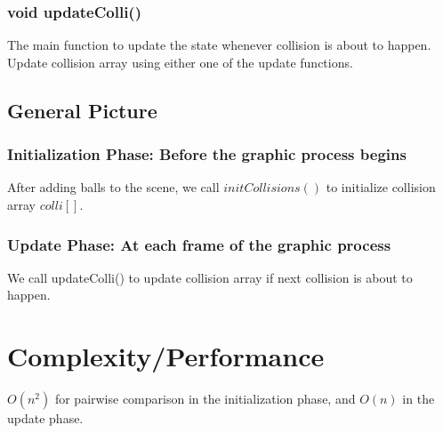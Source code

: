 \documentclass[twoside,10pt]{article}
\begin{document}
\subsubsection{void updateColli()}
The main function to update the state whenever collision is about to happen. Update collision array using either one of the update functions.

\subsection{General Picture}

\subsubsection{Initialization Phase: Before the graphic process begins}
After adding balls to the scene, we call $initCollisions()$ to initialize collision array $colli[]$.


\subsubsection{Update Phase: At each frame of the graphic process}
We call updateColli() to update collision array if next collision is about to happen.


\section{Complexity/Performance}
$O(n^2)$ for pairwise comparison in the initialization phase, and $O(n)$ in the update phase.
\end{document}
